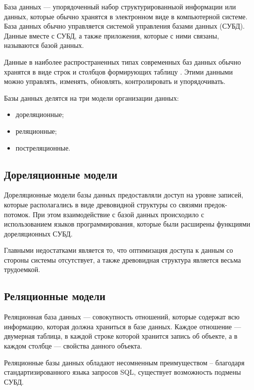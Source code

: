 База данных \cite{db-is} --- упорядоченный набор структурированныой информации или данных, которые обычно хранятся в электронном виде в компьютерной системе. База данных обычно управляется системой управления базами данных (СУБД). Данные вместе с СУБД, а также приложения, которые с ними связаны, называются базой данных.

Данные в наиболее распространенных типах современных баз данных обычно хранятся в виде строк и столбцов формирующих таблицу \cite{db-is}. Этими данными можно управлять, изменять, обновлять, контролировать и упорядочивать.

Базы данных делятся на три модели организации данных:

\begin{itemize}
    \item дореляционные;
    \item реляционные;
    \item постреляционные.
\end{itemize}


\subsection{Дореляционные модели}

Дореляционные модели базы данных \cite{pre_sql} предоставляли доступ на уровне записей, которые располагались в виде древовидной структуры со связями предок-потомок. При этом взаимодействие с базой данных происходило с использованием языков программирования, которые были расширены функциями дореляционных СУБД. 

Главными недостатками является то, что оптимизация доступа к данным со стороны системы отсутствует, а также древовидная структура является весьма трудоемкой.


\subsection{Реляционные модели}

Реляционная база данных \cite{db-sql} --- совокупность отношений, которые содержат всю информацию, которая должна храниться в базе данных. Каждое отношение --- двумерная таблица, в каждой строке которой хранится запись об объекте, а в каждом столбце --- свойства данного объекта.

Реляционные базы данных обладают несомненным преимуществом -- благодаря стандартизированного языка запросов SQL, существует возможность подмены СУБД.


